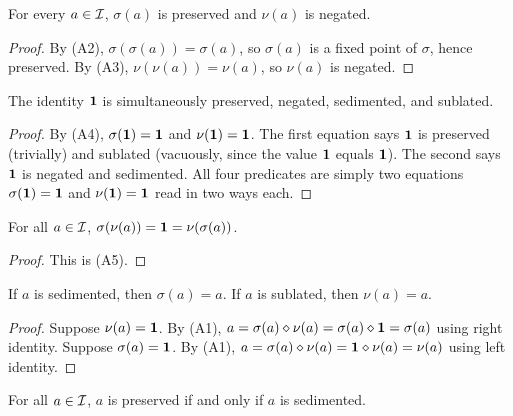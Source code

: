\begin{lemma}\label{lem:proj-fixed}
For every $a\in\mathcal{I}$, $\sigma(a)$ is preserved and $\nu(a)$ is
negated.
\end{lemma}

\begin{proof}
By (A2), $\sigma(\sigma(a))=\sigma(a)$, so $\sigma(a)$ is a fixed
point of $\sigma$, hence preserved. By (A3), $\nu(\nu(a))=\nu(a)$,
so $\nu(a)$ is negated.
\end{proof}

\begin{lemma}\label{lem:ident-quad}
The identity $\mathbf{1}$ is simultaneously preserved, negated, sedimented,
and sublated.
\end{lemma}

\begin{proof}
By (A4), $\sigma(\mathbf{1})=\mathbf{1}$ and $\nu(\mathbf{1})=\mathbf{1}$. The first
equation says $\mathbf{1}$ is preserved (trivially) and sublated
(vacuously, since the value $\mathbf{1}$ equals $\mathbf{1}$). The second says
$\mathbf{1}$ is negated and sedimented. All four predicates are simply
two equations $\sigma(\mathbf{1})=\mathbf{1}$ and $\nu(\mathbf{1})=\mathbf{1}$ read in
two ways each.
\end{proof}

\begin{lemma}\label{lem:cross-trivial}
For all $a\in\mathcal{I}$, $\sigma(\nu(a))=\mathbf{1}=\nu(\sigma(a))$.
\end{lemma}

\begin{proof}
This is (A5).
\end{proof}

\begin{lemma}\label{lem:decomp-collapse}
If $a$ is sedimented, then $\sigma(a)=a$. If $a$ is sublated, then
$\nu(a)=a$.
\end{lemma}

\begin{proof}
Suppose $\nu(a)=\mathbf{1}$. By (A1), $a=\sigma(a)\mathbin{\diamond}\nu(a)
=\sigma(a)\mathbin{\diamond}\mathbf{1}=\sigma(a)$ using right identity. Suppose
$\sigma(a)=\mathbf{1}$. By (A1), $a=\sigma(a)\mathbin{\diamond}\nu(a)=\mathbf{1}
\mathbin{\diamond}\nu(a)=\nu(a)$ using left identity.
\end{proof}

\begin{proposition}\label{prop:pres-sed}
For all $a\in\mathcal{I}$, $a$ is preserved if and only if $a$ is
sedimented.
\end{proposition}


